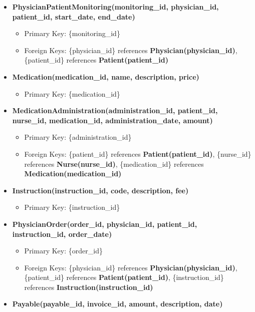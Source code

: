 \documentclass[a4paper,11pt]{article}
\theoremstyle{mytheor}
\begin{document}
\begin{itemize}
    \item \textbf{PhysicianPatientMonitoring(monitoring\_id, physician\_id, patient\_id, start\_date, end\_date)}
        \begin{itemize}
            \item Primary Key: \{monitoring\_id\}
            \item Foreign Keys: \{physician\_id\} references \textbf{Physician(physician\_id)}, \{patient\_id\} references \textbf{Patient(patient\_id)}
        \end{itemize}
    \item \textbf{Medication(medication\_id, name, description, price)}
        \begin{itemize}
            \item Primary Key: \{medication\_id\}
        \end{itemize}
    \item \textbf{MedicationAdministration(administration\_id, patient\_id, nurse\_id, medication\_id, administration\_date, amount)}
        \begin{itemize}
            \item Primary Key: \{administration\_id\}
            \item Foreign Keys: \{patient\_id\} references \textbf{Patient(patient\_id)}, \{nurse\_id\} references \textbf{Nurse(nurse\_id)}, \{medication\_id\} references \textbf{Medication(medication\_id)}
        \end{itemize}
    \item \textbf{Instruction(instruction\_id, code, description, fee)}
        \begin{itemize}
            \item Primary Key: \{instruction\_id\}
        \end{itemize}
    \item \textbf{PhysicianOrder(order\_id, physician\_id, patient\_id, instruction\_id, order\_date)}
        \begin{itemize}
            \item Primary Key: \{order\_id\}
            \item Foreign Keys: \{physician\_id\} references \textbf{Physician(physician\_id)}, \{patient\_id\} references \textbf{Patient(patient\_id)}, \{instruction\_id\} references \textbf{Instruction(instruction\_id)}
        \end{itemize}
    \item \textbf{Payable(payable\_id, invoice\_id, amount, description, date)}
        \begin{itemize}

\end{itemize}
\end{itemize}
\end{document}
